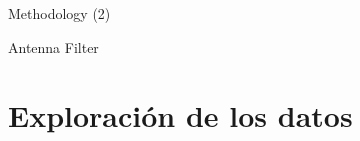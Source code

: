 \documentclass{beamer}
\begin{document}
\begin{frame}{Methodology (2)}
\begin{block}{Antenna Filter}


	\end{block}
\end{frame}

\section{Exploración de los datos}
\end{document}
